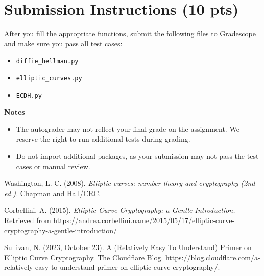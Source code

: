 \documentclass{article}
\begin{document}
\section*{Submission Instructions (10 pts)}
    After you fill the appropriate functions, submit the following files to Gradescope and make sure you pass all test cases:
    \begin{itemize}
        \item \lstinline{diffie_hellman.py}
        \item \lstinline{elliptic_curves.py}
        \item \lstinline{ECDH.py}
    \end{itemize}

    \vspace{3mm}
    \textbf{Notes}
    \begin{itemize}
        \item The autograder may not reflect your final grade on the assignment. We reserve the right to run additional tests during grading.
        \item Do not import additional packages, as your submission may not pass the test cases or manual review.
    \end{itemize}

\begin{thebibliography}{9}
    Washington, L. C. (2008). \textit{Elliptic curves: number theory and cryptography (2nd ed.).} Chapman and Hall/CRC.

    Corbellini, A. (2015). \textit{Elliptic Curve Cryptography: a Gentle Introduction.} Retrieved from https://andrea.corbellini.name/2015/05/17/elliptic-curve-cryptography-a-gentle-introduction/
    
    Sullivan, N. (2023, October 23). A (Relatively Easy To Understand) Primer on Elliptic Curve Cryptography. The Cloudflare Blog. https://blog.cloudflare.com/a-relatively-easy-to-understand-primer-on-elliptic-curve-cryptography/.
\end{thebibliography}
\end{document}
